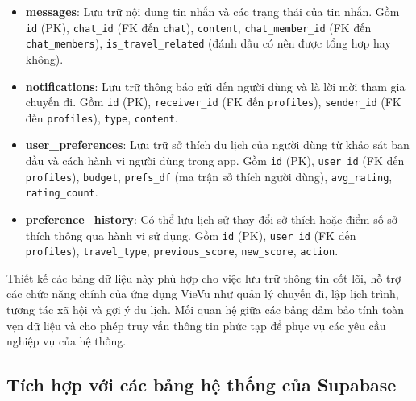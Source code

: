 \begin{itemize}
    \item \textbf{messages}: Lưu trữ nội dung tin nhắn và các trạng thái của tin nhắn. Gồm \texttt{id} (PK), \texttt{chat\_id} (FK đến \texttt{chat}), \texttt{content}, \texttt{chat\_member\_id} (FK đến \texttt{chat\_members}), \texttt{is\_travel\_related} (đánh dấu có nên được tổng hơp hay không).


    \item \textbf{notifications}: Lưu trữ thông báo gửi đến người dùng và là lời mời tham gia chuyến đi. Gồm \texttt{id} (PK), \texttt{receiver\_id} (FK đến \texttt{profiles}), \texttt{sender\_id} (FK đến \texttt{profiles}), \texttt{type}, \texttt{content}.

    \item \textbf{user\_preferences}: Lưu trữ sở thích du lịch của người dùng từ khảo sát ban đầu và cách hành vi người dùng trong app. Gồm \texttt{id} (PK), \texttt{user\_id} (FK đến \texttt{profiles}), \texttt{budget}, \texttt{prefs\_df} (ma trận sở thích người dùng), \texttt{avg\_rating}, \texttt{rating\_count}.

    \item \textbf{preference\_history}: Có thể lưu lịch sử thay đổi sở thích hoặc điểm số sở thích thông qua hành vi sử dụng. Gồm \texttt{id} (PK), \texttt{user\_id} (FK đến \texttt{profiles}), \texttt{travel\_type}, \texttt{previous\_score}, \texttt{new\_score}, \texttt{action}.


   
\end{itemize}
\noindent
Thiết kế các bảng dữ liệu này phù hợp cho việc lưu trữ thông tin cốt lõi, hỗ trợ các chức năng chính của ứng dụng VieVu như quản lý chuyến đi, lập lịch trình, tương tác xã hội và gợi ý du lịch. Mối quan hệ giữa các bảng đảm bảo tính toàn vẹn dữ liệu và cho phép truy vấn thông tin phức tạp để phục vụ các yêu cầu nghiệp vụ của hệ thống.


\subsection{Tích hợp với các bảng hệ thống của Supabase}


